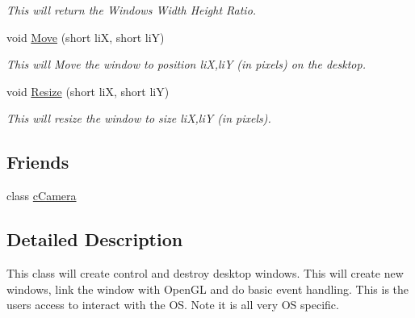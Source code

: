 \begin{DoxyCompactItemize}
\begin{DoxyCompactList}\small\item\em This will return the Windows Width Height Ratio. \end{DoxyCompactList}\item 
\hypertarget{classc_window_a11e2c0045091c6e6826361f8c68b2022}{
void \hyperlink{classc_window_a11e2c0045091c6e6826361f8c68b2022}{Move} (short liX, short liY)}
\label{classc_window_a11e2c0045091c6e6826361f8c68b2022}

\begin{DoxyCompactList}\small\item\em This will Move the window to position liX,liY (in pixels) on the desktop. \end{DoxyCompactList}\item 
\hypertarget{classc_window_a38129c91195b1e7f5711aecc1ffb4d77}{
void \hyperlink{classc_window_a38129c91195b1e7f5711aecc1ffb4d77}{Resize} (short liX, short liY)}
\label{classc_window_a38129c91195b1e7f5711aecc1ffb4d77}

\begin{DoxyCompactList}\small\item\em This will resize the window to size liX,liY (in pixels). \end{DoxyCompactList}\end{DoxyCompactItemize}
\subsection*{Friends}
\begin{DoxyCompactItemize}
\item 
\hypertarget{classc_window_a930db2797d94f26b57e430e155ad81ba}{
class \hyperlink{classc_window_a930db2797d94f26b57e430e155ad81ba}{cCamera}}
\label{classc_window_a930db2797d94f26b57e430e155ad81ba}

\end{DoxyCompactItemize}


\subsection{Detailed Description}
This class will create control and destroy desktop windows. This will create new windows, link the window with OpenGL and do basic event handling. This is the users access to interact with the OS. Note it is all very OS specific. 